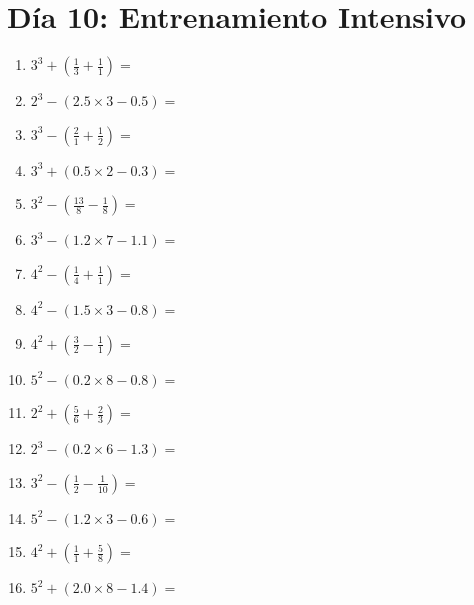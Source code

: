 \documentclass[12pt]{article}
\begin{document}
\section*{Día 10: Entrenamiento Intensivo}
\begin{enumerate}
\item \large $ 3^{3} + (\frac{1}{3} + \frac{1}{1}) = $ \vspace{1.6cm}
\item \large $ 2^{3} - (2.5 \times 3 - 0.5) = $ \vspace{1.6cm}
\item \large $ 3^{3} - (\frac{2}{1} + \frac{1}{2}) = $ \vspace{1.6cm}
\item \large $ 3^{3} + (0.5 \times 2 - 0.3) = $ \vspace{1.6cm}
\item \large $ 3^{2} - (\frac{13}{8} - \frac{1}{8}) = $ \vspace{1.6cm}
\item \large $ 3^{3} - (1.2 \times 7 - 1.1) = $ \vspace{1.6cm}
\item \large $ 4^{2} - (\frac{1}{4} + \frac{1}{1}) = $ \vspace{1.6cm}
\item \large $ 4^{2} - (1.5 \times 3 - 0.8) = $ \vspace{1.6cm}
\item \large $ 4^{2} + (\frac{3}{2} - \frac{1}{1}) = $ \vspace{1.6cm}
\item \large $ 5^{2} - (0.2 \times 8 - 0.8) = $ \vspace{1.6cm}
\newpage
\item \large $ 2^{2} + (\frac{5}{6} + \frac{2}{3}) = $ \vspace{1.6cm}
\item \large $ 2^{3} - (0.2 \times 6 - 1.3) = $ \vspace{1.6cm}
\item \large $ 3^{2} - (\frac{1}{2} - \frac{1}{10}) = $ \vspace{1.6cm}
\item \large $ 5^{2} - (1.2 \times 3 - 0.6) = $ \vspace{1.6cm}
\item \large $ 4^{2} + (\frac{1}{1} + \frac{5}{8}) = $ \vspace{1.6cm}
\item \large $ 5^{2} + (2.0 \times 8 - 1.4) = $ \vspace{1.6cm}

\end{enumerate}
\end{document}
